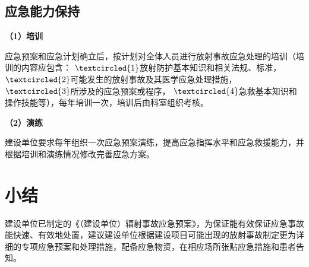 \subsection{应急能力保持}

\textbf{（1）培训}

应急预案和应急计划确立后，按计划对全体人员进行放射事故应急处理的培训（培训的内容应包含： $\textcircled{1}$放射防护基本知识和相关法规、标准， $\textcircled{2}$可能发生的放射事故及其医学应急处理措施， $\textcircled{3}$所涉及的应急预案或程序， $\textcircled{4}$急救基本知识和操作技能等），每年培训一次，培训后由科室组织考核。

\textbf{（2）演练}

建设单位要求每年组织一次应急预案演练，提高应急指挥水平和应急救援能力，并根据培训和演练情况修改完善应急方案。

\section{小结}

建设单位已制定的《（建设单位）辐射事故应急预案》，为保证能有效保证应急事故能快速、有效地处置，建议建设单位根据建设项目可能出现的放射事故制定更为详细的专项应急预案和处理措施，配备应急物资，在相应场所张贴应急措施和患者告知。

